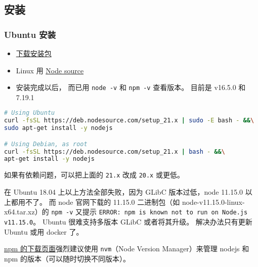 
\begin{issues}
\issueDraft
\end{issues}


\subsection{安装}
\subsubsection{Ubuntu 安装}
\begin{itemize}
\item \href{https://nodejs.org/en/download/package-manager/}{下载安装包}
\item Linux 用 \href{https://github.com/nodesource/distributions/blob/master/README.md#installation-instructions}{Node source}
\item 安装完成以后， 而已用 \verb`node -v` 和 \verb`npm -v` 查看版本。 目前是 v16.5.0 和 7.19.1
\end{itemize}
\begin{lstlisting}[language=bash]
# Using Ubuntu
curl -fsSL https://deb.nodesource.com/setup_21.x | sudo -E bash - &&\
sudo apt-get install -y nodejs

# Using Debian, as root
curl -fsSL https://deb.nodesource.com/setup_21.x | bash - &&\
apt-get install -y nodejs
\end{lstlisting}
如果有依赖问题，可以把上面的 \verb`21.x` 改成 \verb`20.x` 或更低。

在 Ubuntu 18.04 上以上方法全部失败，因为 GLibC 版本过低，node 11.15.0 以上都用不了。 而 node 官网下载的 11.15.0 二进制包（如 node-v11.15.0-linux-x64.tar.xz）的 \verb`npm -v` 又提示 \verb`ERROR: npm is known not to run on Node.js v11.15.0`。 Ubuntu 很难支持多版本 GLibC 或者将其升级。 解决办法只有更新 Ubuntu 或用 docker 了。

\href{https://docs.npmjs.com/downloading-and-installing-node-js-and-npm}{npm 的下载页面}强烈建议使用 \verb`nvm`（Node Version Manager）来管理 nodejs 和 npm 的版本（可以随时切换不同版本）。

